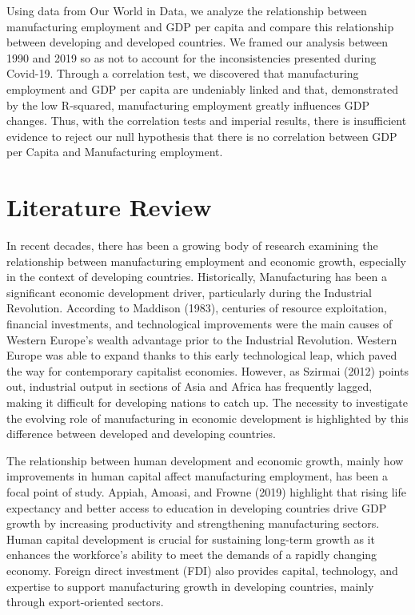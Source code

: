 \documentclass[12pt]{article}
\begin{document}
Using data from Our World in Data, we analyze the relationship between manufacturing employment and GDP per capita and compare this relationship between developing and developed countries. We framed our analysis between 1990 and 2019 so as not to account for the inconsistencies presented during Covid-19. Through a correlation test, we discovered that manufacturing employment and GDP per capita are undeniably linked and that, demonstrated by the low R-squared, manufacturing employment greatly influences GDP changes. Thus, with the correlation tests and imperial results, there is insufficient evidence to reject our null hypothesis that there is no correlation between GDP per Capita and Manufacturing employment. 


\section{Literature Review} \label{sec:literature}



In recent decades, there has been a growing body of research examining the relationship between manufacturing employment and economic growth, especially in the context of developing countries. Historically, Manufacturing has been a significant economic development driver, particularly during the Industrial Revolution. According to Maddison (1983), centuries of resource exploitation, financial investments, and technological improvements were the main causes of Western Europe's wealth advantage prior to the Industrial Revolution. Western Europe was able to expand thanks to this early technological leap, which paved the way for contemporary capitalist economies. However, as Szirmai (2012) points out, industrial output in sections of Asia and Africa has frequently lagged, making it difficult for developing nations to catch up. The necessity to investigate the evolving role of manufacturing in economic development is highlighted by this difference between developed and developing countries.

The relationship between human development and economic growth, mainly how improvements in human capital affect manufacturing employment, has been a focal point of study. Appiah, Amoasi, and Frowne (2019) highlight that rising life expectancy and better access to education in developing countries drive GDP growth by increasing productivity and strengthening manufacturing sectors. Human capital development is crucial for sustaining long-term growth as it enhances the workforce's ability to meet the demands of a rapidly changing economy. Foreign direct investment (FDI) also provides capital, technology, and expertise to support manufacturing growth in developing countries, mainly through export-oriented sectors.
\end{document}

